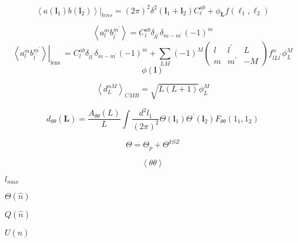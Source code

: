 \documentclass[12pt, notitlepage, onecolumn, amsmath, amssymb, aps]{revtex4-1}
\begin{document}
\begin{equation}
\left.\left\langle a\left(\mathbf{l}_{1}\right) b\left(\mathbf{l}_{2}\right)\right\rangle\right|_{lens}=(2 \pi)^{2} \delta^{2}\left(\mathbf{l}_{1}+\mathbf{l}_{2}\right) C_{\ell}^{ab}+\phi_{\mathbf{L}} f\left(\ell_{1}, \ell_{2}\right)
\end{equation}

\begin{equation}
  \left\langle a_{l}^{m} b_{l^{\prime}}^{m^{\prime}}\right\rangle=C_{l}^{a b} \delta_{l l^{\prime}} \delta_{m-m^{\prime}}(-1)^{m}
\end{equation}
\begin{equation}
  \left.\left\langle a_{l}^{m} b_{l^{\prime}}^{m^{\prime}}\right\rangle\right|_{\text {lens }}=C_{l}^{a b} \delta_{l l^{\prime}} \delta_{m-m^{\prime}}(-1)^{m}+\sum_{L M}(-1)^{M}\left(\begin{array}{ccc}
l & l^{\prime} & L \\
m & m^{\prime} & -M
\end{array}\right) f_{l L l^{\prime}}^{\alpha} \phi_{L}^{M}
\end{equation}
\begin{equation}
  \phi(\mathbf{l})
\end{equation}

\begin{equation}
  \left\langle d_{L}^{\alpha M}\right\rangle_{CMB}=\sqrt{L(L+1)} \phi_{L}^{M}
\end{equation}

\begin{equation}
  d_{\theta\theta}(\mathbf{L})=\frac{A_{\theta\theta}(L)}{L} \int \frac{d^{2} l_{1}}{(2 \pi)^{2}} \Theta\left(\mathbf{l}_{1}\right) \Theta^{\prime}\left(\mathbf{l}_{2}\right) F_{\theta\theta}\left(1_{1}, 1_{2}\right)
\end{equation}

\begin{equation}
  \Theta = \Theta_{p} + \Theta^{kSZ}
\end{equation}

\begin{equation}
  \left\langle \theta \theta\right\rangle
\end{equation}

\(l_{max}\)

\(\Theta(\hat{n})\)

\(Q(\hat{n})\)

\(U(\hat{n})\)
\end{document}
